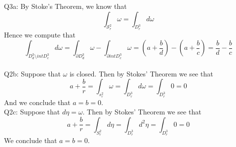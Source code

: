 \documentclass[letterpaper]{article}
\DeclareMathOperator{\s}{\mathcal{S}}
\newcommand{\bd}{\partial}
\begin{document}
\noindent Q3a: By Stoke's Theorem, we know that $$\int_{\s_r^2} \omega = \int_{D_r^3}d\omega$$ Hence we compute that $$\int_{ D_d^3 \setminus in tD_c^3} d\omega  = \int_{\bd D_d^3}\omega - \int_{\bd int D_c^3}\omega = (a+\frac{b}{d}) - (a+\frac{b}{c}) = \frac{b}{d}- \frac{b}{c}$$
\newline \\ Q2b: Suppose that $\omega$ is closed. Then by Stokes' Theorem we see that 
$$a+ \frac{b}{r} = \int_{s^2_r} \omega = \int_{D_r^3} d\omega = \int_{D_r^3} 0 = 0$$
And we conclude that $a=b=0$. 
\newline \\ Q2c: Suppose that $d\eta =\omega$. Then by Stokes' Theorem we see that $$a+\frac{b}{r} = \int_{S_r^2} d\eta  = \int_{D_r^3} d^2\eta = \int_{D_r^3}0 =0$$
We conclude that $a=b=0$. 
\end{document}
